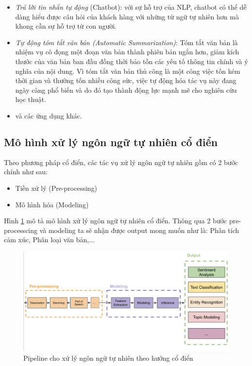 \begin{itemize}
    \item \emph{Trả lời tin nhắn tự động} (Chatbot): với sự hỗ trợ của NLP, chatbot có thể dễ dàng hiểu được câu hỏi của khách hàng với những từ ngữ tự nhiên hơn mà khong cần sự hỗ trợ từ con người.
    \item \emph{Tự động tóm tắt văn bản (Automatic Summarization)}: Tóm tắt văn bản là nhiệm vụ cô đọng một đoạn văn bản thành phiên bản ngắn hơn, giảm kích thước của văn bản ban đầu đồng thời bảo tồn các yếu tố thông tin chính và ý nghĩa của nội dung. Vì tóm tắt văn bản thủ công là một công việc tốn kém thời gian và thường tốn nhiều công sức, việc tự động hóa tác vụ này đang ngày càng phổ biến và do đó tạo thành động lực mạnh mẽ cho nghiên cứu học thuật.
    \item và các ứng dụng khác.
\end{itemize}

\subsection{Mô hình xử lý ngôn ngữ tự nhiên cổ điển}
\label{sec:classic_nlp}
Theo phương pháp cổ điển, các tác vụ xử lý ngôn ngữ tự nhiên gồm có 2 bước chính như sau:
\begin{itemize}
    \item Tiền xử lý (Pre-processing)
    \item Mô hình hóa (Modeling)
\end{itemize}

Hình \ref{fig:pipeline-nlp-classic} mô tả mô hình xử lý ngôn ngữ tự nhiên cổ điển. Thông qua 2 bước pre-processcing và modeling ta sẽ nhận được output mong muốn như là: Phân tích cảm xúc, Phân loại văn bản,...

\begin{figure}[h!]
\begin{center}
	\includegraphics[width=1.0\textwidth]{books/artificial-neural-network/chapter04/figure/classic_nlp.png}
	\caption{Pipeline cho xử lý ngôn ngữ tự nhiên theo hướng cổ điển}
	\label{fig:pipeline-nlp-classic}
\end{center}
\end{figure}

